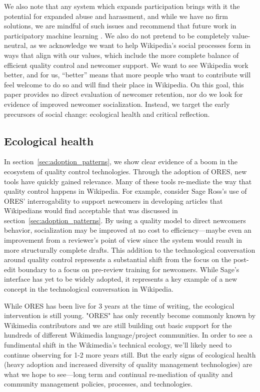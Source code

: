 We also note that any system which expands participation brings with it the potential for expanded abuse and harassment, and while we have no firm solutions, we are mindful of such issues and recommend that future work in participatory machine learning . We also do not pretend to be completely value-neutral, as we acknowledge we want to help Wikipedia's social processes form in ways that align with our values, which include the more complete balance of efficient quality control and newcomer support. We want to see Wikipedia work better, and for us, ``better'' means that more people who want to contribute will feel welcome to do so and will find their place in Wikipedia. On this goal, this paper provides no direct evaluation of newcomer retention, nor do we look for evidence of improved newcomer socialization. Instead, we target the early precursors of social change: ecological health and critical reflection.

\subsection{Ecological health}
In section~\ref{sec:adoption_patterns}, we show clear evidence of a boom in the ecosystem of quality control technologies.  Through the adoption of ORES, new tools have quickly gained relevance.  Many of these tools re-mediate the way that quality control happens in Wikipedia.  For example, consider Sage Ross's use of ORES' interrogability to support newcomers in developing articles that Wikipedians would find acceptable that was discussed in section~\ref{sec:adoption_patterns}.  By using a quality model to direct newcomers behavior, socialization may be improved at no cost to efficiency---maybe even an improvement from a reviewer's point of view since the system would reault in more structurally complete drafts.  This addition to the technological conversation around quality control represents a substantial shift from the focus on the post-edit boundary\cite{geiger2012defense} to a focus on pre-review training for newcomers.  While Sage's interface has yet to be widely adopted, it represents a key example of a new concept in the technological conversation in Wikipedia.

While ORES has been live for 3 years at the time of writing, the ecological intervention is still young.  "ORES" has only recently become commonly known by Wikimedia contributors and we are still building out basic support for the hundreds of different Wikimedia language/project communities.  In order to see a fundimental shift in the Wikimedia's technical ecology, we'll likely need to continue observing for 1-2 more years still.  But the early signs of ecological health (heavy adoption and increased diversity of quality management technologies) are what we hope to see---long term and continual re-mediation of quality and community management policies, processes, and technologies.

